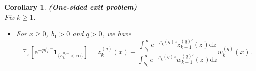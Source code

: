 \documentclass[12pt,reqno]{amsart}
\newtheorem{corol}[theorem]{Corollary}
\theoremstyle{definition}
\theoremstyle{remark}
\newcommand{\e}{\mathbb{E}}
\newcommand{\ind}{\mathbf{1}}
\newcommand{\md}{\mathrm{d}}
\newcommand{\wq}{w^{(q)}}
\begin{document}
\begin{corol}{\textbf{(One-sided exit problem)}}\label{one_sided}\\ 
Fix $k \geq 1$. %

\begin{itemize}
	\item[(i)] For $x \geq 0$, $b_1 > 0$ and $q>0$, we have
		\begin{equation}\label{main_onesided_down}
	\e_x \left[ \mathrm{e}^{-q \kappa_k^{0,-}} \ind_{\{\kappa_k^{0,-}<\infty\}} \right] =z_k^{(q)}(x)-\frac{\int_{b_k}^{\infty} 
	e^{-\varphi_k(q)z}z_{k-1}^{(q)\prime}(z)\md z }{\int^{\infty}_{b_{k}}e^{-\varphi_k(q)z}w_{k-1}^{(q)\prime}(z)\md z}\wq_k(x).
	\end{equation}
	

\end{itemize}
\end{corol}
\end{document}
